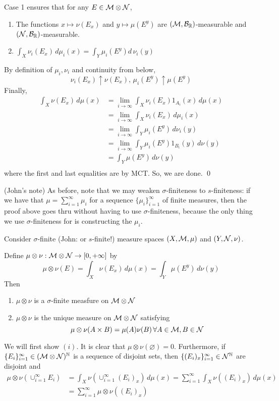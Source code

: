 \documentclass[x11names,reqno,14pt]{extarticle}
\newcommand*{\oo}{\infty}
\newcommand{\seq}[1]{_{#1 = 1}^\oo}
\begin{document}
Case 1 ensures that for any $E \in \mathcal{M}\otimes\mathcal{N}$, 
\begin{enumerate}[label=(\roman*)]
\item The functions $x\mapsto \nu(E_x)$ and $y\mapsto \mu(E^y)$ are $(\mathcal{M},\mathcal{B}_{\mathbb{R}})$-measurable and $(\mathcal{N},\mathcal{B}_{\mathbb{R}})$-measurable. 
\item $\int_X\nu_i(E_x)\,d\mu_i(x) = \int_Y\mu_i(E^y)d\,\nu_i(y)$ 
\end{enumerate}
By definition of $\mu_i, \nu_i$ and continuity from below, 
\[
\nu_i(E_x)\uparrow\nu(E_x),\, \mu_i(E^y)\uparrow\mu(E^y) 
\]
Finally, 
\begin{align*}
\int_X\nu(E_x)\,d\mu(x) & = \lim_{i\to\oo}\int_X\nu_i(E_x)1_{A_i}(x)\,d\mu(x) \\
& = \lim_{i\to\oo}\int_X\nu_i(E_x)\,d\mu_i(x) \\
& = \lim_{i\to\oo}\int_Y\mu_i(E^y)\,d\nu_i(y) \\
& = \lim_{i\to\oo}\int_Y\mu_i(E^y)1_{B_i}(y)\,d\nu(y) \\
& = \int_Y\mu(E^y)\,d\nu(y) \\
\end{align*}
where the first and last equalities are by MCT. So, we are done. 
\qed

\rem (John's note) As before, note that we may weaken $\sigma$-finiteness to $s$-finiteness: if we have that $\mu = \sum\seq{i}\mu_i$ for a sequence $\{\mu_i\}\seq{i}$ of finite measures, then the proof above goes thru without having to use $\sigma$-finiteness, because the only thing we use $\sigma$-finiteness for is constructing the $\mu_i$. 

\thm Consider $\sigma$-finite (John: or $s$-finite!) measure spaces $(X,\mathcal{M},\mu)$ and $(Y, \mathcal{N}, \nu)$. 

Define $\mu\otimes\nu:\mc{M}\otimes\mc{N}\to[0,+\oo]$ by 
\[
\mu\otimes\nu(E) = \int_X\nu(E_x)\,d\mu(x) = \int_Y\mu(E^y)\,d\nu(y)
\]
Then
\begin{enumerate}[label=(\roman*)]
\item $\mu\otimes\nu$ is a $\sigma$-finite measfure on $\mathcal{M}\otimes\mathcal{N}$ 
\item $\mu\otimes\nu$ is the unique measure on $\mathcal{M}\otimes\mathcal{N}$ satisfying
\[
\mu\otimes\nu(A\times B) = \mu(A)\nu(B)\,\forall A \in \mathcal{M},B\in\mathcal{N}
\]
\end{enumerate}

\proof

We will first show $(i)$. It is clear that $\mu\otimes\nu(\varnothing) = 0$. Furthermore, if $\{E_i\}\seq{i} \in (\mc{M}\otimes\mc{N})^\N$ is a sequence of disjoint sets, then $\{(E_i)_x\}\seq{i}\in\mc{N}^\N$ are disjoint and
\begin{align*}
\mu\otimes\nu(\cup\seq{i}E_i) & = \int_X\nu(\cup\seq{i}(E_i)_x)\,d\mu(x) = \sum\seq{i}\int_X\nu((E_i)_x)\,d\mu(x) \\
& = \sum\seq{i}\mu\otimes\nu((E_i)_x) \\
\end{align*}
\end{document}
